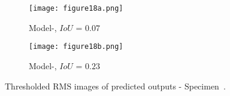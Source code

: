 \begin{figure} [!h]
	\begin{subfigure}[b]{.49\textwidth}
		\centering
		\texttt{[image: figure18a.png]}
		\caption{Model-, \(IoU\) = \(0.07\)}
		\label{fig:RMS_threshold_L3_S4_B_saeed}
	\end{subfigure}
	\hfill
	\begin{subfigure}[b]{.49\textwidth}
		\centering
		\texttt{[image: figure18b.png]}
		\caption{Model-, \(IoU\) = \(0.23\)} 
		\label{fig:RMS_threshold_L3_S4_B_ijjeh}
	\end{subfigure}
	\caption{Thresholded RMS images of predicted outputs - Specimen~.}
	\label{fig:RMS_threshold_L3_S4_B__images}
\end{figure} 
